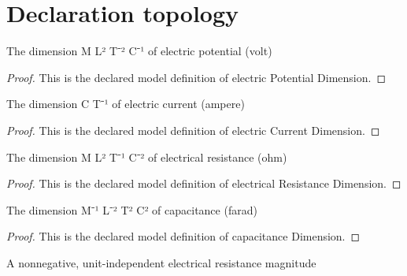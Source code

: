 \section{Declaration topology}
\begin{definition}
  \label{def:physics:phyx-mini-0942:phyxminiproblems-problemphyxmini0942-electricpotentialdimension}
  The dimension M L² T⁻² C⁻¹ of electric potential (volt)
\end{definition}
\begin{proof}
  This is the declared model definition of electric Potential Dimension.
\end{proof}
\begin{definition}
  \label{def:physics:phyx-mini-0942:phyxminiproblems-problemphyxmini0942-electriccurrentdimension}
  The dimension C T⁻¹ of electric current (ampere)
\end{definition}
\begin{proof}
  This is the declared model definition of electric Current Dimension.
\end{proof}
\begin{definition}
  \label{def:physics:phyx-mini-0942:phyxminiproblems-problemphyxmini0942-electricalresistancedimension}
  The dimension M L² T⁻¹ C⁻² of electrical resistance (ohm)
\end{definition}
\begin{proof}
  This is the declared model definition of electrical Resistance Dimension.
\end{proof}
\begin{definition}
  \label{def:physics:phyx-mini-0942:phyxminiproblems-problemphyxmini0942-capacitancedimension}
  The dimension M⁻¹ L⁻² T² C² of capacitance (farad)
\end{definition}
\begin{proof}
  This is the declared model definition of capacitance Dimension.
\end{proof}
\begin{definition}
  \label{def:physics:phyx-mini-0942:phyxminiproblems-problemphyxmini0942-resistancemagnitude}
  A nonnegative, unit-independent electrical resistance magnitude
\end{definition}
